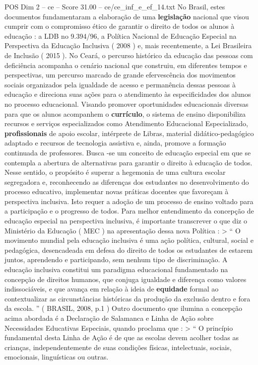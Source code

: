 \begin{textsample}{POS Dim 2 – ce – Score 31.00 – ce/ce\_inf\_e\_ef\_14.txt}
No Brasil, estes documentos fundamentaram a elaboração de uma \textbf{legislação} nacional que visou cumprir com o compromisso ético de garantir o direito de todos os alunos à educação : a LDB no 9.394/96, a Política Nacional de Educação Especial na Perspectiva da Educação Inclusiva ( 2008 ) e, mais recentemente, a Lei Brasileira de Inclusão ( 2015 ).
No Ceará, o percurso histórico da educação das pessoas com deficiência acompanha o cenário nacional que construiu, em diferentes tempos e perspectivas, um percurso marcado de grande efervescência dos movimentos sociais organizados pela igualdade de acesso e permanência dessas pessoas à educação e direciona suas ações para o atendimento às especificidades dos alunos no processo educacional.
Visando promover oportunidades educacionais diversas para que os alunos acompanhem o \textbf{currículo}, o sistema de ensino disponibiliza recursos e serviços especializados como Atendimento Educacional Especializado, \textbf{profissionais} de apoio escolar, intérprete de Libras, material didático-pedagógico adaptado e recursos de tecnologia assistiva e, ainda, promove a formação continuada de professores.
Busca -se um conceito de educação especial em que se contempla a abertura de alternativas para garantir o direito à educação de todos.
Nesse sentido, o propósito é superar a hegemonia de uma cultura escolar segregadora e, reconhecendo as diferenças dos estudantes no desenvolvimento do processo educativo, implementar novas práticas docentes que favoreçam à perspectiva inclusiva.
Isto requer a adoção de um processo de ensino voltado para a participação e o progresso de todos.
Para melhor entendimento da concepção de educação especial na perspectiva inclusiva, é importante transcrever o que diz o Ministério da Educação ( MEC ) na apresentação dessa nova Política : > “ O movimento mundial pela educação inclusiva é uma ação política, cultural, social e pedagógica, desencadeada em defesa do direito de todos os estudantes de estarem juntos, aprendendo e participando, sem nenhum tipo de discriminação.
A educação inclusiva constitui um paradigma educacional fundamentado na concepção de direitos humanos, que conjuga igualdade e diferença como valores indissociáveis, e que avança em relação à ideia de \textbf{equidade} formal ao contextualizar as circunstâncias históricas da produção da exclusão dentro e fora da escola. ” ( BRASIL, 2008, p.1 ) Outro documento que ilumina a concepção acima abordada é a Declaração de Salamanca e Linha de Ação sobre Necessidades Educativas Especiais, quando proclama que : > “ O princípio fundamental desta Linha de Ação é de que as escolas devem acolher todas as crianças, independentemente de suas condições físicas, intelectuais, sociais, emocionais, linguísticas ou outras.

\end{textsample}
